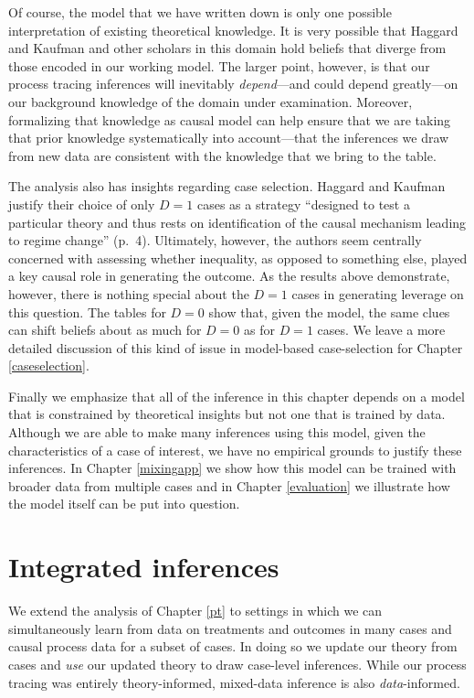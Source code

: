 \documentclass[
  12pt,
]{book}
\newenvironment{headerbox}{
  \definecolor{shadecolor}{rgb}{0.8, 0.8, 0.8}  %
  \color{black}
  \begin{shaded}}{\end{shaded}}
\begin{document}
Of course, the model that we have written down is only one possible interpretation of existing theoretical knowledge. It is very possible that Haggard and Kaufman and other scholars in this domain hold beliefs that diverge from those encoded in our working model. The larger point, however, is that our process tracing inferences will inevitably \emph{depend}---and could depend greatly---on our background knowledge of the domain under examination. Moreover, formalizing that knowledge as causal model can help ensure that we are taking that prior knowledge systematically into account---that the inferences we draw from new data are consistent with the knowledge that we bring to the table.

The analysis also has insights regarding case selection. Haggard and Kaufman justify their choice of only \(D=1\) cases as a strategy ``designed to test a particular theory and thus rests on identification of the causal mechanism leading to regime change'' (p.~4). Ultimately, however, the authors seem centrally concerned with assessing whether inequality, as opposed to something else, played a key causal role in generating the outcome. As the results above demonstrate, however, there is nothing special about the \(D=1\) cases in generating leverage on this question. The tables for \(D=0\) show that, given the model, the same clues can shift beliefs about as much for \(D=0\) as for \(D=1\) cases. We leave a more detailed discussion of this kind of issue in model-based case-selection for Chapter \ref{caseselection}.

Finally we emphasize that all of the inference in this chapter depends on a model that is constrained by theoretical insights but not one that is trained by data. Although we are able to make many inferences using this model, given the characteristics of a case of interest, we have no empirical grounds to justify these inferences. In Chapter \ref{mixingapp} we show how this model can be trained with broader data from multiple cases and in Chapter \ref{evaluation} we illustrate how the model itself can be put into question.

\hypertarget{mixing}{%
\chapter{Integrated inferences}\label{mixing}}

\begin{headerbox}
We extend the analysis of Chapter \ref{pt} to settings in which we can simultaneously learn from data on treatments and outcomes in many cases and causal process data for a subset of cases. In doing so we update our theory from cases and \emph{use} our updated theory to draw case-level inferences. While our process tracing was entirely theory-informed, mixed-data inference is also \emph{data}-informed.

\end{headerbox}
\end{document}
